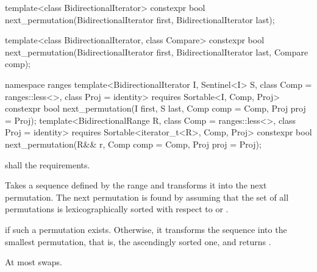 %
\begin{itemdecl}
template<class BidirectionalIterator>
  constexpr bool next_permutation(BidirectionalIterator first,
                                  BidirectionalIterator last);

template<class BidirectionalIterator, class Compare>
  constexpr bool next_permutation(BidirectionalIterator first,
                                  BidirectionalIterator last, Compare comp);
\end{itemdecl}
\begin{addedblock}
\begin{itemdecl}
namespace ranges {
  template<BidirectionalIterator I, Sentinel<I> S, class Comp = ranges::less<>,
      class Proj = identity>
    requires Sortable<I, Comp, Proj>
    constexpr bool
      next_permutation(I first, S last, Comp comp = Comp{}, Proj proj = Proj{});
  template<BidirectionalRange R, class Comp = ranges::less<>,
      class Proj = identity>
    requires Sortable<iterator_t<R>, Comp, Proj>
    constexpr bool
      next_permutation(R&& r, Comp comp = Comp{}, Proj proj = Proj{});
}
\end{itemdecl}
\end{addedblock}

\begin{itemdescr}
\pnum
\requires
{}
 shall  the
 requirements.

\pnum
\effects
Takes a sequence defined by the range
and transforms it into the next permutation.
The next permutation is found by assuming that the set of all permutations is
lexicographically sorted with respect to
or  .

\pnum
\returns
{}
if such a permutation exists.
Otherwise, it transforms the sequence into the smallest permutation,
that is, the ascendingly sorted one, and returns
.

\pnum
\complexity
At most
swaps.
\end{itemdescr}


